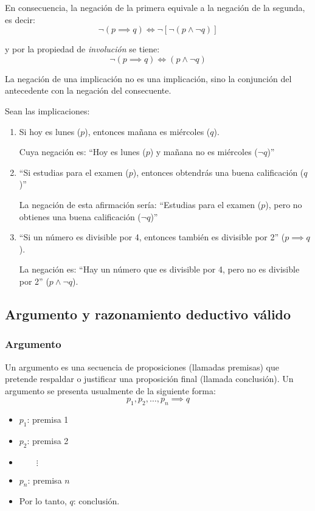 En consecuencia, la negación de la primera equivale a la negación de la segunda, es decir:
\[ \neg (p \implies q) \iff \neg [ \neg (p \land \neg q)] \]

y por la propiedad de \textit{involución} se tiene:
\[ \neg (p \implies q) \iff (p \land \neg q) \]

La negación de una implicación no es una implicación, sino la conjunción del antecedente con la negación del consecuente.

\begin{fmd-example}
	Sean las implicaciones:
	
	\begin{enumerate}[label=\roman*)]
		\item Si hoy es lunes ($p$), entonces mañana es miércoles ($q$).
		
		Cuya negación es: ``Hoy es lunes ($p$) y mañana no es miércoles ($\neg q$)''
		
		\item ``Si estudias para el examen ($p$), entonces obtendrás una buena calificación ($q$)''
		
		La negación de esta afirmación sería: ``Estudias para el examen ($p$), pero no obtienes una buena calificación ($\neg q$)''
		
		\item ``Si un número es divisible por 4, entonces también es divisible por 2'' ($p \implies q$).
		
		La negación es: ``Hay un número que es divisible por 4, pero no es divisible por 2'' ($ p \land \neg q$).
	\end{enumerate}
\end{fmd-example}

\subsection{Argumento y razonamiento deductivo válido}

\subsubsection{Argumento} 
\begin{fmd-definition}[Argumento]
	Un \gls{argumento} es una secuencia de proposiciones (llamadas premisas) que pretende respaldar o justificar una proposición final (llamada conclusión). Un argumento se presenta usualmente de la siguiente forma:
	\[ p_1, p_2, \dots, p_n \implies q \]
	
	\begin{itemize}[itemsep=-3pt]
		\item $p_1$: premisa 1
		\item $p_2$: premisa 2
		\item $\qquad \vdots$
		\item $p_n$: premisa $n$
		\item Por lo tanto, $q$: conclusión.
	\end{itemize}
\end{fmd-definition}

